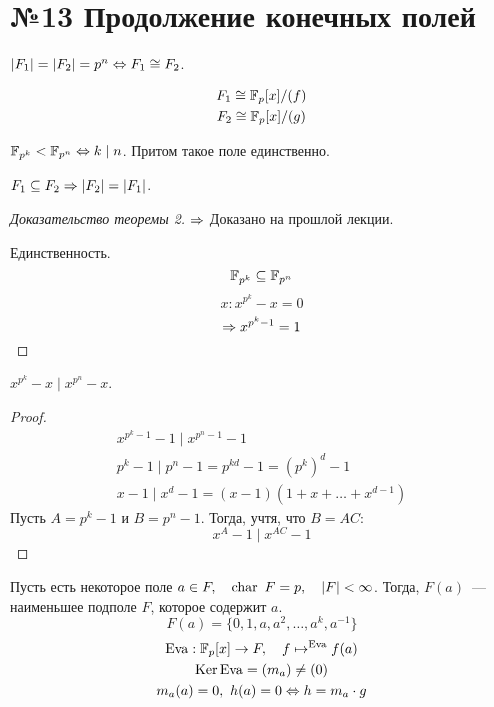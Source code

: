 \section{№13 Продолжение конечных полей}

\begin{theorem}[1]
  $|F_1| = |F_2| = p^n \Leftrightarrow F_1 \cong F_2$.
\end{theorem}

\begin{example}
  \begin{gather}
    F_1 \cong \mathbb{F}_p[x]/(f) \\
    F_2 \cong \mathbb{F}_p[x]/(g) 
  \end{gather}
\end{example}

\begin{theorem}[2]
  \label{th:2nl}
  $\mathbb{F}_{p^k} < \mathbb{F}_{p^n} \Leftrightarrow k \mid n$. Притом такое поле единственно.
\end{theorem}

\begin{example}
  $F_1 \subseteq F_2 \Rightarrow |F_2| = |F_1|$.
\end{example}

\begin{proof}[Доказательство теоремы 2]
  \item[$\Rightarrow$] Доказано на прошлой лекции.
  \item[Единственность.]
  \[\mathbb{F}_{p^k} \subseteq \mathbb{F}_{p^n}\]
  \[x : x ^{p^k} - x = 0 \]
  \[\Rightarrow x^{p^k - 1} = 1\]
\end{proof}

\begin{lemma}
  $x^{p^k} - x \mid x^{p^n} - x$.
\end{lemma}

\begin{proof}
  \begin{gather}
    x^{p^k - 1} - 1 \mid x^{p^n - 1} - 1 \\
    p^k - 1 \mid p^n - 1 = p^{kd} - 1 = {(p^k)}^d - 1 \\
    x - 1 \mid x^d - 1 = (x-1)(1 + x + \dots + x^{d-1}) 
  \end{gather}
  Пусть $A = p^k - 1$ и $B = p^n - 1$. Тогда, учтя, что $B = AC$:
  \[x^A - 1 \mid x^{AC} - 1\]
\end{proof}

Пусть есть некоторое поле $a \in F, \quad \operatorname{char} \ F = p, \quad |F| < \infty$. Тогда, $F(a)$~--- наименьшее подполе $F$, которое содержит $a$.
\[F(a) = \{0, 1, a, a^2, \dots, a^k, a^{-1}\}\]
\begin{gather}
  \operatorname{Eva} : \mathbb{F}_p[x] \rightarrow F, \quad f \mapsto^{\operatorname{Eva}} f(a) \\
  \operatorname{Ker} \operatorname{Eva} = (m_a) \neq (0) \\
  m_a(a) = 0, \ h(a) = 0 \Leftrightarrow h = m_a \cdot g
\end{gather}

